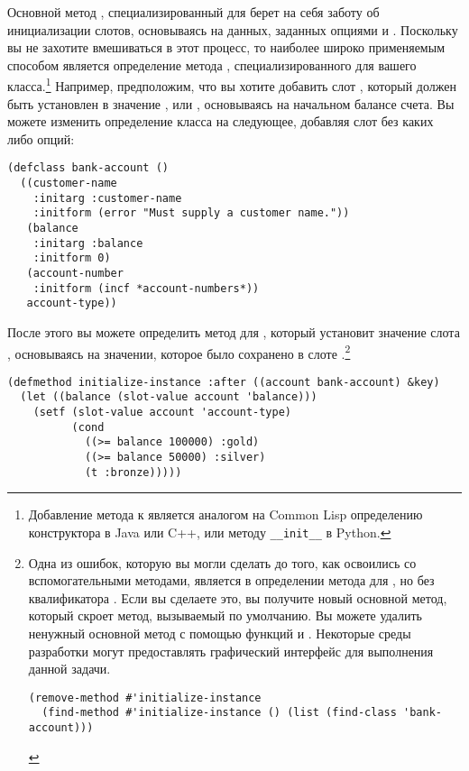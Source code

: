 Основной метод , специализированный для 
берет на себя заботу об инициализации слотов, основываясь на данных, заданных опциями
 и .  Поскольку вы не захотите вмешиваться в этот процесс,
то наиболее широко применяемым способом является определение метода ,
специализированного для вашего класса.\footnote{Добавление метода  к
   является аналогом на Common Lisp определению конструктора в
  Java или C++, или методу \lstinline!__init__! в Python.}  Например, предположим, что вы
хотите добавить слот , который должен быть установлен в значение
,  или , основываясь на начальном балансе счета.
Вы можете изменить определение класса на следующее, добавляя слот  без
каких либо опций:

\begin{lstlisting}
(defclass bank-account ()
  ((customer-name
    :initarg :customer-name
    :initform (error "Must supply a customer name."))
   (balance
    :initarg :balance
    :initform 0)
   (account-number
    :initform (incf *account-numbers*))
   account-type))
\end{lstlisting}

После этого вы можете определить метод  для ,
который установит значение слота , основываясь на значении, которое
было сохранено в слоте .\footnote{Одна из ошибок, которую вы могли сделать
  до того, как освоились со вспомогательными методами, является в определении метода для
  , но без квалификатора .  Если вы сделаете это,
  вы получите новый основной метод, который скроет метод, вызываемый по умолчанию.  Вы
  можете удалить ненужный основной метод с помощью функций  и
  .  Некоторые среды разработки могут предоставлять графический
  интерфейс для выполнения данной задачи.

\begin{lstlisting}
(remove-method #'initialize-instance
  (find-method #'initialize-instance () (list (find-class 'bank-account)))
\end{lstlisting}
}

\begin{lstlisting}
(defmethod initialize-instance :after ((account bank-account) &key)
  (let ((balance (slot-value account 'balance)))
    (setf (slot-value account 'account-type)
          (cond
            ((>= balance 100000) :gold)
            ((>= balance 50000) :silver)
            (t :bronze)))))
\end{lstlisting}

